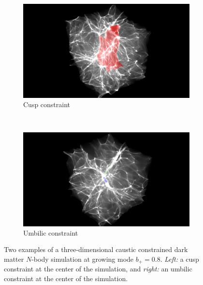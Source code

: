 \documentclass[a4paper, 11pt]{article}
\begin{document}
\begin{figure}
  \centering
  \begin{subfigure}[b]{0.49\textwidth}
  \includegraphics[width=\textwidth, trim={15cm 0 15cm 0},clip]{3D_Cusp}
  \caption{Cusp constraint}
  \end{subfigure}~
  \begin{subfigure}[b]{0.49\textwidth}
  \includegraphics[width=\textwidth, trim={15cm 0 15cm 0},clip]{3D_Umbilic}
  \caption{Umbilic constraint}
  \end{subfigure}
  \caption{Two examples of a three-dimensional caustic constrained dark matter $N$-body simulation at growing mode $b_+=0.8$. \textit{Left:} a cusp constraint at the center of the simulation, and \textit{right:} an umbilic constraint at the center of the simulation.}
  \label{fig:3DExample}
  \end{figure}

\end{document}

